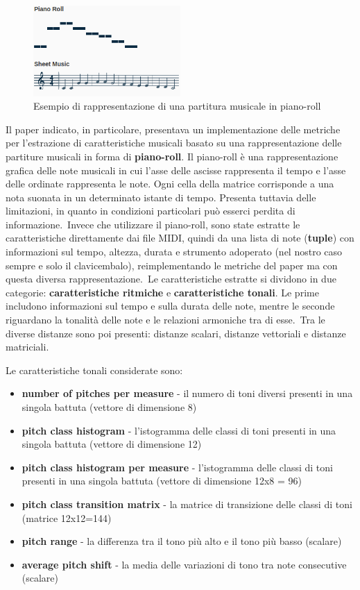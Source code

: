 \begin{figure}[h]
    \centering
    \includegraphics[width=0.5\textwidth]{../images/piano_roll.png}
    \caption{Esempio di rappresentazione di una partitura musicale in piano-roll}
\end{figure}

Il paper indicato, in particolare, presentava un implementazione delle metriche per l'estrazione di caratteristiche musicali basato su una rappresentazione delle partiture musicali in forma di \textbf{piano-roll}.
Il piano-roll è una rappresentazione grafica delle note musicali in cui l'asse delle ascisse rappresenta il tempo e l'asse delle ordinate rappresenta le note. Ogni cella della matrice corrisponde a una nota suonata in un determinato istante di tempo. Presenta tuttavia delle limitazioni, in quanto in condizioni particolari può esserci perdita di informazione.\
Invece che utilizzare il piano-roll, sono state estratte le caratteristiche direttamente dai file MIDI, quindi da una lista di note (\textbf{tuple}) con informazioni sul tempo, altezza, durata e strumento adoperato (nel nostro caso sempre e solo il clavicembalo), reimplementando le metriche del paper ma con questa diversa rappresentazione.\
Le caratteristiche estratte si dividono in due categorie: \textbf{caratteristiche ritmiche} e \textbf{caratteristiche tonali}. Le prime includono informazioni sul tempo e sulla durata delle note, mentre le seconde riguardano la tonalità delle note e le relazioni armoniche tra di esse.\
Tra le diverse distanze sono poi presenti: distanze scalari, distanze vettoriali e distanze matriciali.\

Le caratteristiche tonali considerate sono:
\begin{itemize}
    \item \textbf{number of pitches per measure} - il numero di toni diversi presenti in una singola battuta (vettore di dimensione 8)
    \item \textbf{pitch class histogram} - l'istogramma delle classi di toni presenti in una singola battuta (vettore di dimensione 12)
    \item \textbf{pitch class histogram per measure} - l'istogramma delle classi di toni presenti in una singola battuta (vettore di dimensione 12x8 = 96)
    \item \textbf{pitch class transition matrix} - la matrice di transizione delle classi di toni (matrice 12x12=144)
    \item \textbf{pitch range} - la differenza tra il tono più alto e il tono più basso (scalare)
    \item \textbf{average pitch shift} - la media delle variazioni di tono tra note consecutive (scalare)
\end{itemize}

